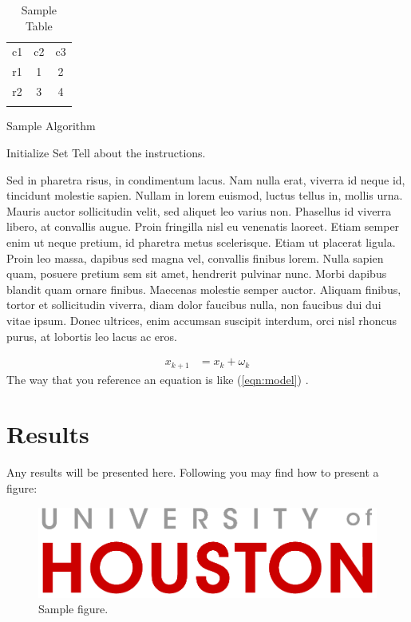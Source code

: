 \documentclass[10pt,conference]{ieeeconf}
\begin{document}
\begin{table}[H]
\centering
\caption{Sample Table}
\label{tab:1}       %
\begin{tabular}{ccc}
\hline\noalign{\smallskip}
c1 & c2 & c3\\
\noalign{\smallskip}\hline\noalign{\smallskip}
r1 & 1 & 2 \\
r2 & 3 & 4 \\
\noalign{\smallskip}\hline\noalign{\smallskip}
\end{tabular}
\end{table}

\begin{algorithm}[H]
  \caption{Sample Algorithm}\label{euclid}
  \begin{algorithmic}[1]
   \State Initialize
   \State Set 
  \EndFor
\State Tell about the instructions.  
\end{algorithmic}
\end{algorithm} 

Sed in pharetra risus, in condimentum lacus. Nam nulla erat, viverra id neque id, tincidunt molestie sapien. Nullam in lorem euismod, luctus tellus in, mollis urna. Mauris auctor sollicitudin velit, sed aliquet leo varius non. Phasellus id viverra libero, at convallis augue. Proin fringilla nisl eu venenatis laoreet. Etiam semper enim ut neque pretium, id pharetra metus scelerisque. Etiam ut placerat ligula. Proin leo massa, dapibus sed magna vel, convallis finibus lorem. Nulla sapien quam, posuere pretium sem sit amet, hendrerit pulvinar nunc. Morbi dapibus blandit quam ornare finibus. Maecenas molestie semper auctor. Aliquam finibus, tortor et sollicitudin viverra, diam dolor faucibus nulla, non faucibus dui dui vitae ipsum. Donec ultrices, enim accumsan suscipit interdum, orci nisl rhoncus purus, at lobortis leo lacus ac eros.

\begin{align}\label{eqn:model}
    x_{k+1} &= x_k +\omega_k
\end{align}
The way that you reference an equation is like (\ref{eqn:model}) .

\section{Results}

Any results will be presented here.
Following you may find how to present a figure:

\begin{figure}[h]
\centering
  \includegraphics[scale=1]{uh-primary.png}
  \caption{Sample figure.}
  \label{fig:uh}
\end{figure}
\end{document}
